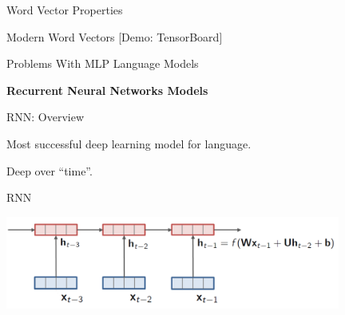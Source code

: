 \documentclass{beamer}
\let\tempone\itemize
\let\temptwo\enditemize
\renewenvironment{itemize}{\tempone\addtolength{\itemsep}{0.5\baselineskip}}{\temptwo}
\begin{document}

\begin{frame}{Word Vector Properties}
  
  

\end{frame}


\begin{frame}{Modern Word Vectors}  
  [Demo: TensorBoard]
\end{frame}



\begin{frame}{Problems With MLP Language Models}  
  
\end{frame}

\begin{frame}
  \begin{center}
    \textbf{Recurrent Neural Networks Models}
  \end{center}
\end{frame}


\begin{frame}{RNN: Overview}
  
  \begin{itemize}
  \item Most successful deep learning model for language. 
    
  \item Deep over ``time''.  
  \end{itemize}
\end{frame}


\begin{frame}{RNN}
  \begin{center}
    \includegraphics[width=11cm]{rnn}
  \end{center}  
\end{frame}
\end{document}
